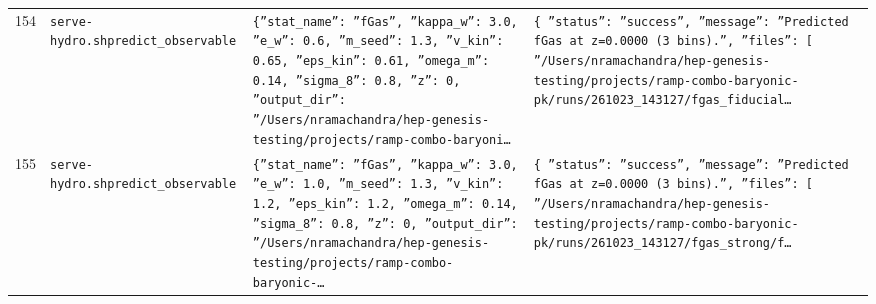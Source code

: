\documentclass[11pt,a4paper]{article}
\begin{document}
\begin{longtable}{@{}p{}p{}p{}p{}@{}}
154 & \texttt{serve-hydro.sh}\newline\texttt{predict\_\allowbreak{}observable} & \texttt{\{''stat\_\allowbreak{}name'':\allowbreak{} ''fGas'',\allowbreak{} ''kappa\_\allowbreak{}w'':\allowbreak{} 3.0,\allowbreak{} ''e\_\allowbreak{}w'':\allowbreak{} 0.6,\allowbreak{} ''m\_\allowbreak{}seed'':\allowbreak{} 1.3,\allowbreak{} ''v\_\allowbreak{}kin'':\allowbreak{} 0.65,\allowbreak{} ''eps\_\allowbreak{}kin'':\allowbreak{} 0.61,\allowbreak{} ''omega\_\allowbreak{}m'':\allowbreak{} 0.14,\allowbreak{} ''sigma\_\allowbreak{}8'':\allowbreak{} 0.8,\allowbreak{} ''z'':\allowbreak{} 0,\allowbreak{} ''output\_\allowbreak{}dir'':\allowbreak{} ''/\allowbreak{}Users/\allowbreak{}nramachandra/\allowbreak{}hep-genesis-testing/\allowbreak{}projects/\allowbreak{}ramp-combo-baryoni\ldots{}\allowbreak{}} & \texttt{\{   ''status'':\allowbreak{} ''success'',\allowbreak{}   ''message'':\allowbreak{} ''Predicted fGas at z=\allowbreak{}0.0000 (3 bins)\allowbreak{}.'',\allowbreak{}   ''files'':\allowbreak{} [     ''/\allowbreak{}Users/\allowbreak{}nramachandra/\allowbreak{}hep-genesis-testing/\allowbreak{}projects/\allowbreak{}ramp-combo-baryonic-pk/\allowbreak{}runs/\allowbreak{}261023\_\allowbreak{}143127/\allowbreak{}fgas\_\allowbreak{}fiducial\ldots{}\allowbreak{}} \\
155 & \texttt{serve-hydro.sh}\newline\texttt{predict\_\allowbreak{}observable} & \texttt{\{''stat\_\allowbreak{}name'':\allowbreak{} ''fGas'',\allowbreak{} ''kappa\_\allowbreak{}w'':\allowbreak{} 3.0,\allowbreak{} ''e\_\allowbreak{}w'':\allowbreak{} 1.0,\allowbreak{} ''m\_\allowbreak{}seed'':\allowbreak{} 1.3,\allowbreak{} ''v\_\allowbreak{}kin'':\allowbreak{} 1.2,\allowbreak{} ''eps\_\allowbreak{}kin'':\allowbreak{} 1.2,\allowbreak{} ''omega\_\allowbreak{}m'':\allowbreak{} 0.14,\allowbreak{} ''sigma\_\allowbreak{}8'':\allowbreak{} 0.8,\allowbreak{} ''z'':\allowbreak{} 0,\allowbreak{} ''output\_\allowbreak{}dir'':\allowbreak{} ''/\allowbreak{}Users/\allowbreak{}nramachandra/\allowbreak{}hep-genesis-testing/\allowbreak{}projects/\allowbreak{}ramp-combo-baryonic-\ldots{}\allowbreak{}} & \texttt{\{   ''status'':\allowbreak{} ''success'',\allowbreak{}   ''message'':\allowbreak{} ''Predicted fGas at z=\allowbreak{}0.0000 (3 bins)\allowbreak{}.'',\allowbreak{}   ''files'':\allowbreak{} [     ''/\allowbreak{}Users/\allowbreak{}nramachandra/\allowbreak{}hep-genesis-testing/\allowbreak{}projects/\allowbreak{}ramp-combo-baryonic-pk/\allowbreak{}runs/\allowbreak{}261023\_\allowbreak{}143127/\allowbreak{}fgas\_\allowbreak{}strong/\allowbreak{}f\ldots{}\allowbreak{}} \\

\end{longtable}
\end{document}
